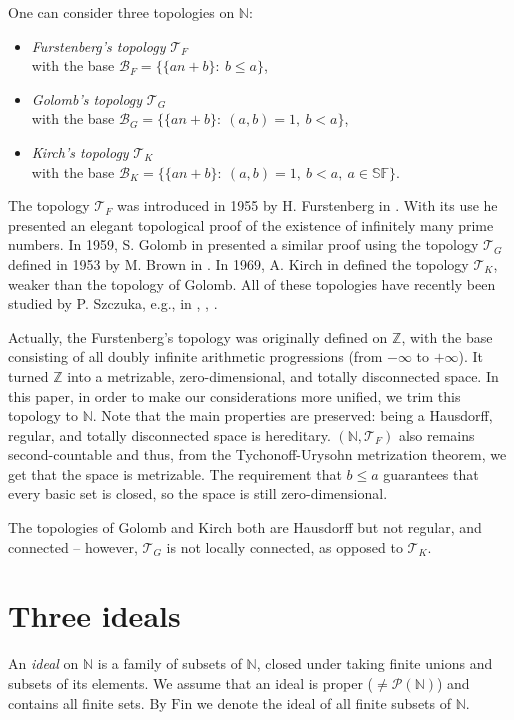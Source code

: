 \documentclass{amsart}
\theoremstyle{definition}
\newcommand{\N}{{\mathbb N}}
\newcommand{\Z}{{\mathbb Z}}
\newcommand{\Fin}{\textrm{Fin}}
\newcommand{\T}{\mathcal{T}}
\newcommand{\B}{\mathcal{B}}
\newcommand{\SqrFr}{\mathbb{SF}}
\newcommand{\arithseq}[2]{\{#1n + #2\}}
\begin{document}
One can consider three topologies on $\N$:
\begin{itemize}
\item \emph{Furstenberg's topology} $\T_F$ \\
			with the base $\B_F = \{\arithseq{a}{b} :\ b\leq a\}$,
\item \emph{Golomb's topology} $\T_G$ \\
			with the base $\B_G = \{\arithseq{a}{b} :\ (a,b)=1,\ b<a\}$,
\item \emph{Kirch's topology} $\T_K$ \\
			with the base $\B_K = \{\arithseq{a}{b} :\ (a,b)=1,\ b<a,\ a\in\SqrFr\}$.
\end{itemize}

The topology $\T_F$ was introduced in 1955 by H. Furstenberg in \cite{F}. With its use he presented an elegant topological proof of the existence of infinitely many prime numbers. In 1959, S. Golomb in \cite{G} presented a similar proof using the topology $\T_G$ defined in 1953 by M. Brown in \cite{B}. In 1969, A. Kirch in \cite{K} defined the topology $\T_K$, weaker than the topology of Golomb. All of these topologies have recently been studied by P. Szczuka, e.g., in \cite{Szczuka1}, \cite{Szczuka2}, \cite{Szczuka3}.

Actually, the Furstenberg's topology was originally defined on $\Z$, with the base consisting of all doubly infinite arithmetic progressions (from $-\infty$ to $+\infty$). It turned $\Z$ into a metrizable, zero-dimensional, and totally disconnected space. In this paper, in order to make our considerations more unified, we trim this topology to $\N$. Note that the main properties are preserved: being a Hausdorff, regular, and totally disconnected space is hereditary. $(\N,\T_F)$ also remains second-countable and thus, from the Tychonoff-Urysohn metrization theorem, we get that the space is metrizable. The requirement that $b\leq a$ guarantees that every basic set is closed, so the space is still zero-dimensional.

The topologies of Golomb and Kirch both are Hausdorff but not regular, and connected -- however, $\T_G$ is not locally connected, as opposed to $\T_K$.


\section*{Three ideals}

An \emph{ideal} on $\N$ is a family of subsets of $\N$, closed under taking finite unions and subsets of its elements. We assume that an ideal is proper ($\neq \mathcal{P}(\N)$) and contains all finite sets. By $\Fin$ we denote the ideal of all finite subsets of $\N$.
\end{document}

